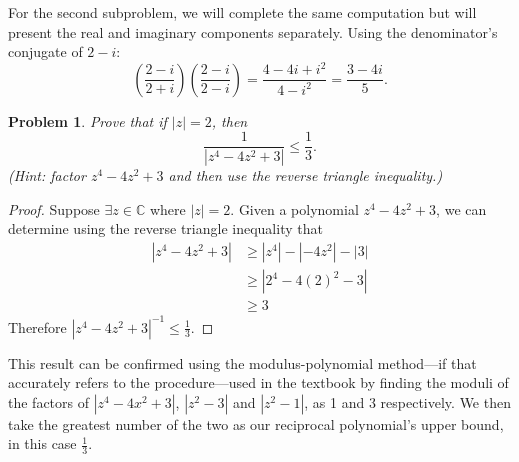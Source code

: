 \documentclass[12pt]{article}
\newtheorem{problem}{Problem}
\numberwithin{problem}{section} %
\theoremstyle{remark}  %
\begin{document}
     For the second subproblem, we will complete the same computation but will present the real and imaginary components separately. Using the denominator's conjugate of $2-i$: $$ \left(\frac{2-i}{2+i}\right)\left(\frac{2-i}{2-i}\right) = \frac{4-4i+i^2}{4 - i^2} = \frac{3-4i}{5}. $$ 
\vspace{.5em}
    \begin{problem}
        Prove that if $|z|=2$, then $$\frac{1}{|z^4-4z^2+3|}\leq\frac{1}{3}.$$ (Hint: factor $z^4-4z^2+3$ and then use the reverse triangle inequality.)
    \end{problem}
    \begin{proof}
        Suppose $\exists z\in\mathbb{C}$ where $|z|=2$. Given a polynomial $z^4-4z^2+3$, we can determine using the reverse triangle inequality that
        \begin{align*}
            |z^4-4z^2+3| &\geq |z^4|-|-4z^2|-|3| \\
                         &\geq |2^4-4(2)^2-3| \\
                         &\geq 3
        \end{align*}
        Therefore $|z^4-4z^2+3|^{-1}\leq\frac{1}{3}$.
    \end{proof}
    This result can be confirmed using the modulus-polynomial method---if that accurately refers to the procedure---used in the textbook by finding the moduli of the factors of $|z^4-4x^2+3|$, $|z^2-3|$ and $|z^2-1|$, as 1 and 3 respectively. We then take the greatest number of the two as our reciprocal polynomial's upper bound, in this case $\frac{1}{3}$.
\end{document}
